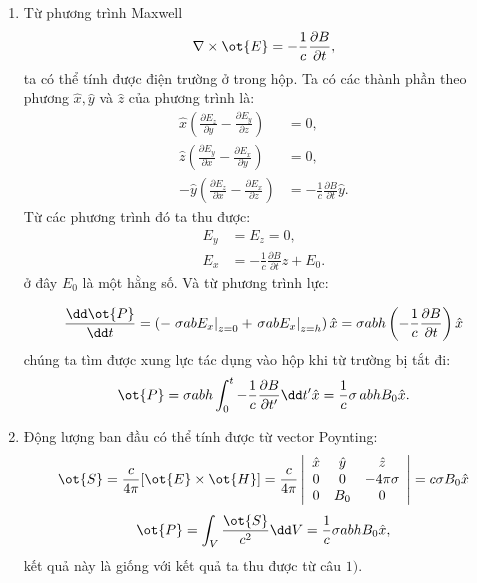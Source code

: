 \begin{loigiai}
  \begin{enumerate}[1)]
   \item Từ phương trình Maxwell 
   $$\nabla \times \ot{E} = - \frac{1}{c} \frac{\partial B}{\partial t},$$
ta có thể tính được điện trường ở trong hộp. Ta có các thành phần theo phương $\hat{{x}}, \hat{y}$ và ${\hat{z}}$ của phương trình là:
\begin{align*}
    {\hat{x}} \left(\frac{\partial E_z}{\partial y} - \frac{\partial E_y}{\partial z}\right) &= 0,\\
    {\hat{z}} \left(\frac{\partial E_y}{\partial x} - \frac{\partial E_x}{\partial y}\right) &= 0,\\
    -{\hat{y}} \left(\frac{\partial E_z}{\partial x} - \frac{\partial E_x}{\partial z}\right) &= - \frac{1}{c} \frac{\partial B}{\partial t} {\hat{y}}.
\end{align*}
Từ các phương trình đó ta thu được:
\begin{align*}
    E_y &= E_z =0,\\
    E_x &= -\frac{1}{c} \frac{\partial B}{\partial t} z + E_0.
\end{align*}
ở đây $E_0$ là một hằng số. Và từ phương trình lực:

   $$\frac{\dd \ot{P}}{\dd t}=\left(-\left.\sigma a b E_{x}\right|_{z=0}+\left.\sigma a b E_{x}\right|_{z=h}\right) \hat{{x}}=\sigma a b h\left(-\frac{1}{c} \frac{\partial B}{\partial t}\right) \hat{{x}}$$
chúng ta tìm được xung lực tác dụng vào hộp khi từ trường bị tắt đi:
   $$\ot{P}=\sigma a b h \int_{0}^{t}-\frac{1}{c} \frac{\partial B}{\partial t^{\prime}} \dd t^{\prime} \hat{{x}}=\frac{1}{c} \sigma \, a b h B_{0} \hat{{x}}.$$
\item  Động lượng ban đầu có thể tính được từ vector Poynting: 
   $$\ot{S}=\frac{c}{4 \pi}[\ot{E} \times \ot{H}]=\frac{c}{4 \pi}\left|\begin{array}{ccc}
\hat{{x}} & \hat{{y}} & \hat{{z}} \\
0 & 0 & -4 \pi \sigma \\
0 & B_{0} & 0
\end{array}\right|=c \sigma B_{0} \hat{{x}}$$
        $$\ot{P} = \int_{V} \frac{\ot{S}}{c^2}\dd V = \frac{1}{c} \sigma a b h B_0 {\hat{x}} ,$$
kết quả này là giống với kết quả ta thu được từ câu $1).$
\end{enumerate}
\end{loigiai}


